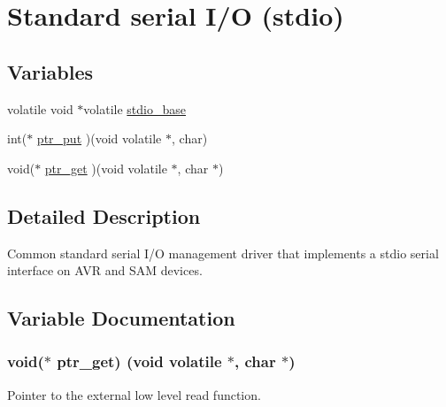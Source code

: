\hypertarget{group__group__common__utils__stdio__stdio__serial}{}\section{Standard serial I/\+O (stdio)}
\label{group__group__common__utils__stdio__stdio__serial}
\subsection*{Variables}
\begin{DoxyCompactItemize}
\item 
volatile void $\ast$volatile \hyperlink{group__group__common__utils__stdio__stdio__serial_gad4163ee0eaa09db3b42c367fd768e737}{stdio\+\_\+base}
\item 
int($\ast$ \hyperlink{group__group__common__utils__stdio__stdio__serial_gab88750c764f1e24b95134201373aba70}{ptr\+\_\+put} )(void volatile $\ast$, char)
\item 
void($\ast$ \hyperlink{group__group__common__utils__stdio__stdio__serial_ga7332be07af3c0ab09d41a9b0b97efbe8}{ptr\+\_\+get} )(void volatile $\ast$, char $\ast$)
\end{DoxyCompactItemize}


\subsection{Detailed Description}
Common standard serial I/\+O management driver that implements a stdio serial interface on A\+V\+R and S\+A\+M devices. 

\subsection{Variable Documentation}
\hypertarget{group__group__common__utils__stdio__stdio__serial_ga7332be07af3c0ab09d41a9b0b97efbe8}{}
\subsubsection[{ptr\+\_\+get}]{\setlength{\rightskip}{0pt plus 5cm}void($\ast$ ptr\+\_\+get) (void volatile $\ast$, char $\ast$)}\label{group__group__common__utils__stdio__stdio__serial_ga7332be07af3c0ab09d41a9b0b97efbe8}
Pointer to the external low level read function. \hypertarget{group__group__common__utils__stdio__stdio__serial_gab88750c764f1e24b95134201373aba70}{}
